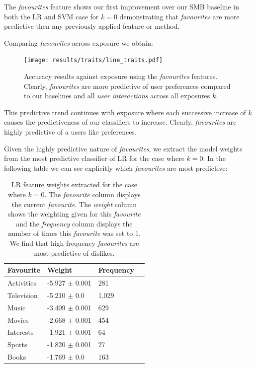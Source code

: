\clearpage

The \emph{favourites} feature shows our first improvement over our SMB baseline in both the LR and SVM case for $k=0$ demonstrating that 
\emph{favourites} are more predictive then any previously applied feature or method.

Comparing \emph{favourites} across exposure we obtain:

\begin{figure}[h]
	\begin{center}
		\texttt{[image: results/traits/line\_traits.pdf]}
		\caption{Accuracy results against exposure using the \emph{favourites} features. Clearly, \emph{favourites} are more predictive of
				 user preferences compared to our baselines and all \emph{user interactions} across all exposures $k$.}
	\end{center}
\end{figure}

This predictive trend continues with exposure where each successive increase of $k$ causes the predictiveness of our classifiers to increase. 
Clearly, \emph{favourites} are highly predictive of a users like preferences.

\clearpage

Given the highly predictive nature of \emph{favourites}, we extract the model weights from the most predictive classifier of LR for the case where $k=0$.
In the following table we can see explicitly which \emph{favourites} are most predictive:

\begin{table}[h]
\begin{minipage}[b]{1.0\textwidth}
\centering
  \begin{tabular}{|l|l|l|l|} %
  \hline
  		\textbf{Favourite} & \textbf{Weight} & \textbf{Frequency} \\ \hline
		Activities & -5.927 $\pm$ 0.001 & 281 \\ \hline
		Television & -5.210 $\pm$ 0.0 & 1,029 \\ \hline
		Music & -3.409 $\pm$ 0.001 & 629 \\ \hline
		Movies & -2.668 $\pm$ 0.001 & 454 \\ \hline
		Interests & -1.921 $\pm$ 0.001 & 64 \\ \hline
		Sports & -1.820 $\pm$ 0.001 & 27 \\ \hline		
		Books & -1.769 $\pm$ 0.0 & 163 \\ \hline		
  \end{tabular}
  \caption{LR feature weights extracted for the case where $k=0$. The \emph{favourite} column displays the current \emph{favourite}.
  The \emph{weight} column shows the weighting given for this \emph{favourite} and the \emph{frequency} column displays the number of times 
  this \emph{favourite} was set to $1$. We find that high frequency \emph{favourites} are most predictive of dislikes.}
\end{minipage}
\end{table}


